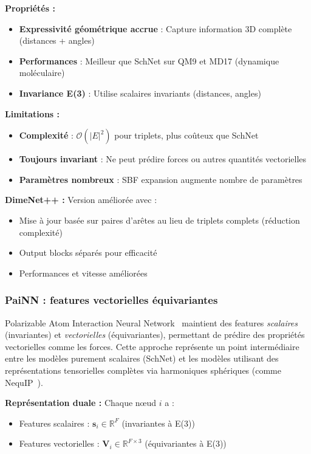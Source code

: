 \textbf{Propriétés :}
\begin{itemize}
    \item \textbf{Expressivité géométrique accrue} : Capture information 3D complète (distances + angles)
    \item \textbf{Performances} : Meilleur que SchNet sur QM9 et MD17 (dynamique moléculaire)
    \item \textbf{Invariance E(3)} : Utilise scalaires invariants (distances, angles)
\end{itemize}

\textbf{Limitations :}
\begin{itemize}
    \item \textbf{Complexité} : $\mathcal{O}(|E|^2)$ pour triplets, plus coûteux que SchNet
    \item \textbf{Toujours invariant} : Ne peut prédire forces ou autres quantités vectorielles
    \item \textbf{Paramètres nombreux} : SBF expansion augmente nombre de paramètres
\end{itemize}

\textbf{DimeNet++ :}
Version améliorée avec :
\begin{itemize}
    \item Mise à jour basée sur paires d'arêtes au lieu de triplets complets (réduction complexité)
    \item Output blocks séparés pour efficacité
    \item Performances et vitesse améliorées
\end{itemize}

\subsubsection{PaiNN : features vectorielles équivariantes}

Polarizable Atom Interaction Neural Network~\cite{Schutt2021} maintient des features \textit{scalaires} (invariantes) et \textit{vectorielles} (équivariantes), permettant de prédire des propriétés vectorielles comme les forces. Cette approche représente un point intermédiaire entre les modèles purement scalaires (SchNet) et les modèles utilisant des représentations tensorielles complètes via harmoniques sphériques (comme NequIP~\cite{Batzner2022}).

\textbf{Représentation duale :}
Chaque nœud $i$ a :
\begin{itemize}
    \item Features scalaires : $\mathbf{s}_i \in \mathbb{R}^{F}$ (invariantes à E(3))
    \item Features vectorielles : $\mathbf{V}_i \in \mathbb{R}^{F \times 3}$ (équivariantes à E(3))
\end{itemize}

